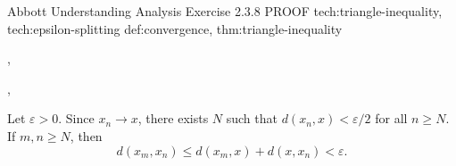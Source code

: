 
\ExerciseMeta
  {Abbott}
  {Understanding Analysis}
  {Exercise 2.3.8}
  {PROOF}
  {tech:triangle-inequality, tech:epsilon-splitting}
  {def:convergence, thm:triangle-inequality}

\begin{exerciseproofrecord}

\begin{remark*}[Technique]
,
\end{remark*}

\begin{remark*}[Dependencies]
,
\end{remark*}

Let $\varepsilon > 0$. Since $x_n \to x$, there exists $N$ such that
$d(x_n,x)<\varepsilon/2$ for all $n\ge N$. If $m,n\ge N$, then
\[
d(x_m,x_n)\le d(x_m,x)+d(x,x_n)<\varepsilon.
\]

\end{exerciseproofrecord}
